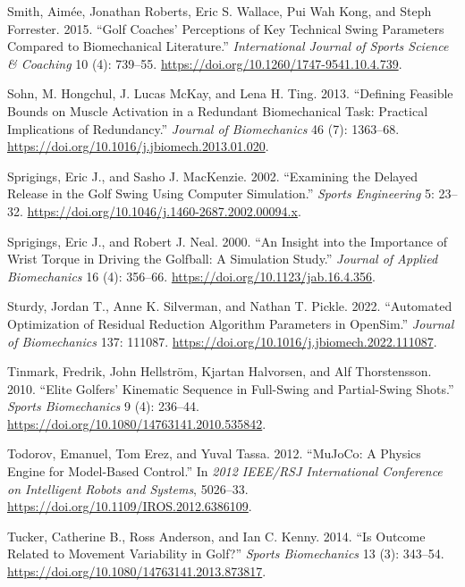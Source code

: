 \documentclass[
  letterpaper,
]{report}
\newlength{\cslhangindent}
\newenvironment{CSLReferences}[2] %
 {\begin{list}{}{%
  \setlength{\itemindent}{0pt}
  \setlength{\leftmargin}{0pt}
  \setlength{\parsep}{0pt}
  \ifodd #1
   \setlength{\leftmargin}{\cslhangindent}
   \setlength{\itemindent}{-1\cslhangindent}
  \fi
  \setlength{\itemsep}{#2\baselineskip}}}
 {\end{list}}
\begin{document}
\begin{CSLReferences}{1}{0}
Smith, Aimée, Jonathan Roberts, Eric S. Wallace, Pui Wah Kong, and Steph
Forrester. 2015. {``Golf Coaches' Perceptions of Key Technical Swing
Parameters Compared to Biomechanical Literature.''} \emph{International
Journal of Sports Science \& Coaching} 10 (4): 739--55.
\url{https://doi.org/10.1260/1747-9541.10.4.739}.

Sohn, M. Hongchul, J. Lucas McKay, and Lena H. Ting. 2013. {``Defining
Feasible Bounds on Muscle Activation in a Redundant Biomechanical Task:
Practical Implications of Redundancy.''} \emph{Journal of Biomechanics}
46 (7): 1363--68. \url{https://doi.org/10.1016/j.jbiomech.2013.01.020}.

Sprigings, Eric J., and Sasho J. MacKenzie. 2002. {``Examining the
Delayed Release in the Golf Swing Using Computer Simulation.''}
\emph{Sports Engineering} 5: 23--32.
\url{https://doi.org/10.1046/j.1460-2687.2002.00094.x}.

Sprigings, Eric J., and Robert J. Neal. 2000. {``An Insight into the
Importance of Wrist Torque in Driving the Golfball: A Simulation
Study.''} \emph{Journal of Applied Biomechanics} 16 (4): 356--66.
\url{https://doi.org/10.1123/jab.16.4.356}.

Sturdy, Jordan T., Anne K. Silverman, and Nathan T. Pickle. 2022.
{``Automated Optimization of Residual Reduction Algorithm Parameters in
{OpenSim}.''} \emph{Journal of Biomechanics} 137: 111087.
\url{https://doi.org/10.1016/j.jbiomech.2022.111087}.

Tinmark, Fredrik, John Hellström, Kjartan Halvorsen, and Alf
Thorstensson. 2010. {``Elite Golfers' Kinematic Sequence in Full-Swing
and Partial-Swing Shots.''} \emph{Sports Biomechanics} 9 (4): 236--44.
\url{https://doi.org/10.1080/14763141.2010.535842}.

Todorov, Emanuel, Tom Erez, and Yuval Tassa. 2012. {``{MuJoCo}: A
Physics Engine for Model-Based Control.''} In \emph{2012 IEEE/RSJ
International Conference on Intelligent Robots and Systems}, 5026--33.
\url{https://doi.org/10.1109/IROS.2012.6386109}.

Tucker, Catherine B., Ross Anderson, and Ian C. Kenny. 2014. {``Is
Outcome Related to Movement Variability in Golf?''} \emph{Sports
Biomechanics} 13 (3): 343--54.
\url{https://doi.org/10.1080/14763141.2013.873817}.


\end{CSLReferences}
\end{document}
